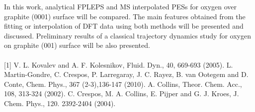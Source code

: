 In this work, analytical FPLEPS and MS interpolated PESs for oxygen over graphite
(0001) surface will be compared. The main features obtained from the fitting or
interpolation of DFT data using both methods will be presented and discussed.
Preliminary results of a classical trajectory dynamics study for oxygen on graphite
(001) surface will be also presented.
\\
\vspace{0.5cm}
\\
{\footnotesize
[1] V. L. Kovalev and A. F. Kolesnikov, Fluid. Dyn., 40, 669-693 (2005).
\newline
[2] L. Martin-Gondre, C. Crespos, P. Larregaray, J. C. Rayez, B. van Ootegem and D. Conte, Chem. Phys.,
367 (2-3),136-147 (2010).
\newline
[3] A. Collins, Theor. Chem. Acc., 108, 313-324 (2002).
\newline
[4] C. Crespos, M. A. Collins, E. Pijper and G. J. Kroes, J. Chem. Phys., 120. 2392-2404 (2004).
}
